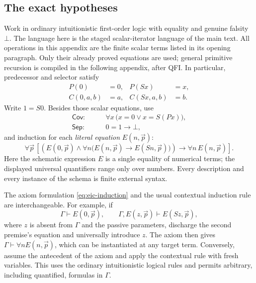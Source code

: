 \documentclass[11pt]{article}
\theoremstyle{definition}\newtheorem{definition}[theorem]{Definition}
\begin{document}
\subsection{The exact hypotheses}

Work in ordinary intuitionistic first-order logic with equality and genuine
falsity $\bot$.  The language here is the staged scalar-iterator language of the main text.
All operations in this appendix are the finite scalar terms listed in its
opening paragraph. Only their already proved equations are used; general
primitive recursion is compiled in the following appendix, after QFI.
In particular, predecessor and selector satisfy
\begin{align}
 P(0)&=0, & P(Sx)&=x, \label{eq:eic-predecessor}\\
 C(0,a,b)&=a, & C(Sx,a,b)&=b. \label{eq:eic-selector}
\end{align}
Write $1=S0$.  Besides those scalar equations, use
\begin{align}
 \mathsf{Cov}:&\qquad
       \forall x\,\bigl(x=0\lor x=S(Px)\bigr),
       \label{eq:eic-coverage}\\
 \mathsf{Sep}:&\qquad 0=1\longrightarrow\bot,
       \label{eq:eic-separation}
\end{align}
and induction for each \emph{literal equation} $E(n,\vec p)$:
\begin{equation}
 \forall\vec p\,
 \left[
   \left(E(0,\vec p)\land
       \forall n\bigl(E(n,\vec p)\longrightarrow E(Sn,\vec p)\bigr)
   \right)
   \longrightarrow\forall n\,E(n,\vec p)
 \right].
 \label{eq:eic-induction}
\end{equation}
Here the schematic expression $E$ is a single equality of numerical
terms; the displayed universal quantifiers range only over numbers.
Every description and every instance of the schema is finite external
syntax.

The axiom formulation \eqref{eq:eic-induction} and the usual contextual
induction rule are interchangeable.  For example, if
\[
 \Gamma\vdash E(0,\vec p),
 \qquad
 \Gamma,E(z,\vec p)\vdash E(Sz,\vec p),
\]
where $z$ is absent from $\Gamma$ and the passive parameters, discharge the
second premise's equation and universally introduce $z$.  The axiom then
gives $\Gamma\vdash\forall n E(n,\vec p)$, which can be instantiated at any
target term.  Conversely, assume the antecedent of the axiom and apply the
contextual rule with fresh variables.  This uses the ordinary intuitionistic
logical rules and permits arbitrary, including quantified, formulas in
$\Gamma$.
\end{document}
